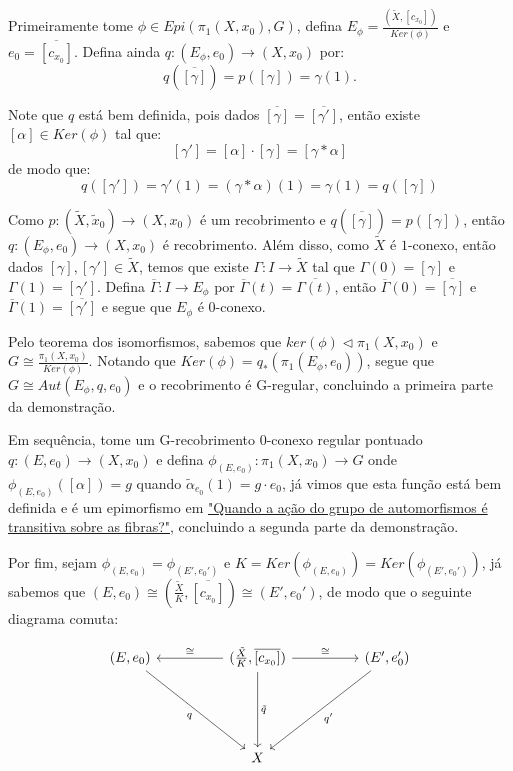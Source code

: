 \begin{dem}
    Primeiramente tome $\phi \in Epi(\pi_1(X, x_0), G)$, defina $E_{\phi} = \frac{(\tilde X, [c_{x_0}])}{Ker(\phi)}$ e $e_0 = \overline{[c_{x_0}]}$. Defina ainda $q:(E_{\phi}, e_0) \longrightarrow (X, x_0)$ por: $$q(\overline{[\gamma]}) = p([\gamma]) = \gamma(1).$$

    Note que $q$ está bem definida, pois dados $\overline{[\gamma]} = \overline{[\gamma']}$, então existe $[\alpha] \in Ker(\phi)$ tal que: $$[\gamma'] = [\alpha] \cdot [\gamma] = [\gamma * \alpha]$$ de modo que: $$q([\gamma']) = \gamma'(1) = (\gamma * \alpha)(1) = \gamma(1) = q([\gamma])$$

    Como $p: (\tilde X, \tilde x_0) \longrightarrow (X, x_0)$ é um recobrimento e $q(\overline{[\gamma]}) = p([\gamma])$,  então $q:(E_{\phi}, e_0) \longrightarrow (X, x_0)$ é recobrimento. Além disso, como $\tilde X$ é $1$-conexo, então dados $[\gamma], [\gamma'] \in \tilde X$, temos que existe $\Gamma: I \longrightarrow \tilde X$ tal que $\Gamma(0) = [\gamma]$ e $\Gamma(1) = [\gamma']$. Defina $\overline{\Gamma}: I \longrightarrow E_{\phi}$ por $\overline{\Gamma}(t) = \overline{\Gamma(t)}$, então $\overline{\Gamma}(0) = \overline{[\gamma]}$ e $\overline{\Gamma}(1) = \overline{[\gamma']}$ e segue que $E_{\phi}$ é $0$-conexo.

    Pelo teorema dos isomorfismos, sabemos que $ker(\phi) \triangleleft \pi_1(X, x_0)$ e $G \cong \frac{\pi_1(X, x_0)}{Ker(\phi)}$. Notando que $Ker(\phi) = q_*(\pi_1(E_{\phi}, e_0))$, segue que $G \cong Aut(E_{\phi}, q, e_0)$ e o recobrimento é G-regular, concluindo a primeira parte da demonstração.

    Em sequência, tome um G-recobrimento $0$-conexo regular pontuado $q:(E, e_0) \longrightarrow (X, x_0)$ e defina $\phi_{(E, e_0)}: \pi_1(X, x_0) \longrightarrow G$ onde $\phi_{(E, e_0)}([\alpha]) = g$ quando $\tilde \alpha_{e_0}(1) = g \cdot e_0$, já vimos que esta função está bem definida e é um epimorfismo em \hyperref[acao-de-automorfismo-transitiva-prop]{"Quando a ação do grupo de automorfismos é transitiva sobre as fibras?"}, concluindo a segunda parte da demonstração.

    Por fim, sejam $\phi_{(E, e_0)} = \phi_{(E', e_0')}$ e $K = Ker(\phi_{(E, e_0)}) = Ker(\phi_{(E', e_0')})$, já sabemos que $(E, e_0) \cong (\frac{\tilde X}{K}, \overline{[c_{x_0}]}) \cong (E', e_0')$, de modo que o seguinte diagrama comuta:

    \[\begin{tikzcd}
    	{(E,e_0)} && {(\frac{\tilde X}{K}, \overline{[c_{x_0}]})} && {(E', e_0')} \\
    	\\
    	\\
    	&& X
    	\arrow["q"', from=1-1, to=4-3]
    	\arrow["\cong"', from=1-3, to=1-1]
    	\arrow["\cong", from=1-3, to=1-5]
    	\arrow["{\tilde q}", from=1-3, to=4-3]
    	\arrow["{q'}", from=1-5, to=4-3]
    \end{tikzcd}\]


\end{dem}
